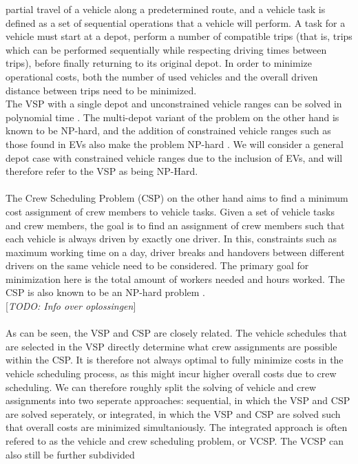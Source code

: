 \documentclass[]{article}
\newcommand{\todo}[1]{{\color{red}[\textit{TODO: #1}]}}
\begin{document}
partial travel of a vehicle along a predetermined route, and a vehicle task is
defined as a set of sequential operations that a vehicle will perform. A task for a
vehicle must start at a depot, perform a number of compatible trips (that is,
trips which can be performed sequentially while respecting driving times
between trips), before finally returning to its original depot. In order to
minimize operational costs, both the number of used vehicles and the overall driven
distance between trips need to be minimized. \\ The VSP
with a single depot and unconstrained vehicle ranges can be solved in
polynomial time \cite{Freling2003SDVSP}. The multi-depot variant of the problem
on the other hand is known to be NP-hard, and the addition of constrained vehicle ranges such as those found
in EVs also make the problem NP-hard \cite{Bodin1983}. We will consider a
general depot case with constrained vehicle ranges due to the inclusion of EVs,
and will therefore refer to the VSP as being NP-Hard. \\\\ The Crew
Scheduling Problem (CSP) on the other hand aims to find a minimum cost
assignment of crew members to vehicle tasks. Given a set of vehicle tasks and
crew members, the goal is to find an assignment of crew members such that each
vehicle is always driven by exactly one driver. In this, constraints such as
maximum working time on a day, driver breaks and handovers between different
drivers on the same vehicle need to be considered. The primary goal for
minimization here is the total amount of workers needed and hours worked. The
CSP is also known to be an NP-hard problem \cite{Fischetti1989}.\\ \todo{Info
  over oplossingen} \\\\ As can be seen, the VSP and CSP are closely related. The
vehicle schedules that are selected in the VSP directly determine what crew
assignments are possible within the CSP. It is therefore not always optimal to
fully minimize costs in the vehicle scheduling process, as this might incur
higher overall costs due to crew scheduling. We can therefore roughly split the
solving of vehicle and crew assignments into two seperate approaches:
sequential, in which the VSP and CSP are solved seperately, or integrated, in
which the VSP and CSP are solved such that overall costs are minimized
simultaniously. The integrated approach is often refered to as the vehicle and
crew scheduling problem, or VCSP. The VCSP can also still be further subdivided
\end{document}
